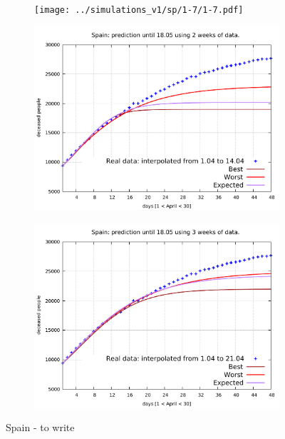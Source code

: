 \documentclass[8pt]{article}
\begin{document}
\begin{figure}[h!]
  \centering
  \begin{subfigure}[b]{0.45\linewidth}
  \texttt{[image: ../simulations\_v1/sp/1-7/1-7.pdf]}
  \end{subfigure}
  \begin{subfigure}[b]{0.45\linewidth}
    \includegraphics[width=\linewidth]{../simulations_v1/sp/1-14/1-14.pdf}
  \end{subfigure}
  \begin{subfigure}[b]{0.45\linewidth}
  \includegraphics[width=\linewidth]{../simulations_v1/sp/1-21/1-21.pdf}
  \end{subfigure}
	\caption{Spain - to write}
\end{figure}
\end{document}
